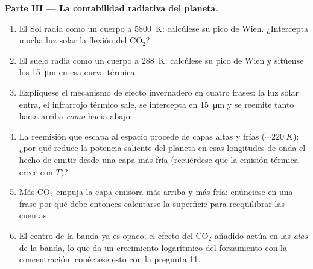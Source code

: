 \begin{problem}
\medskip\noindent\textbf{Parte III --- La contabilidad radiativa del planeta.}
\begin{enumerate}[resume]
  \item El Sol radia como un cuerpo a \qty{5800}{K}: calcúlese su pico de
        Wien. ¿Intercepta mucha luz solar la flexión del CO$_2$?
  \item El suelo radia como un cuerpo a \qty{288}{K}: calcúlese su pico
        de Wien y sitúense los \qty{15}{\micro m} en esa curva térmica.
  \item Explíquese el mecanismo de efecto invernadero en cuatro frases: la
        luz solar entra, el infrarrojo térmico sale, se intercepta en
        \qty{15}{\micro m} y se reemite tanto hacia arriba \emph{como}
        hacia abajo.
  \item La reemisión que escapa al espacio procede de capas altas y frías
        ($\sim\qty{220}{K}$): ¿por qué reduce la potencia saliente del
        planeta en esas longitudes de onda el hecho de emitir desde una
        capa más fría (recuérdese que la emisión térmica crece con $T$)?
  \item Más CO$_2$ empuja la capa emisora más arriba y más fría:
        enúnciese en una frase por qué debe entonces calentarse la
        superficie para reequilibrar las cuentas.
  \item El centro de la banda ya es opaco; el efecto del CO$_2$ añadido
        actúa en las \emph{alas} de la banda, lo que da un crecimiento
        logarítmico del forzamiento con la concentración: conéctese esto
        con la pregunta 11.
\end{enumerate}


\end{problem}
